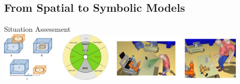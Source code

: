 \documentclass[compress]{beamer}
\begin{document}
\subsection{From Spatial to Symbolic Models}
\begin{frame}{Situation Assessment}
        \centering
        \\
        \vspace*{1em}
        \includegraphics[width=0.9\textwidth]{spark}

\end{frame}
\end{document}
